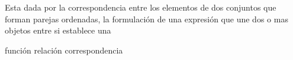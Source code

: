 
\question Esta dada por la correspondencia entre los elementos de dos
          conjuntos que forman parejas ordenadas, la formulación de una
          expresión que une dos o mas objetos entre si establece una \fillin

  \begin{oneparchoices}
    \choice función
    \CorrectChoice relación
    \choice correspondencia
  \end{oneparchoices}
